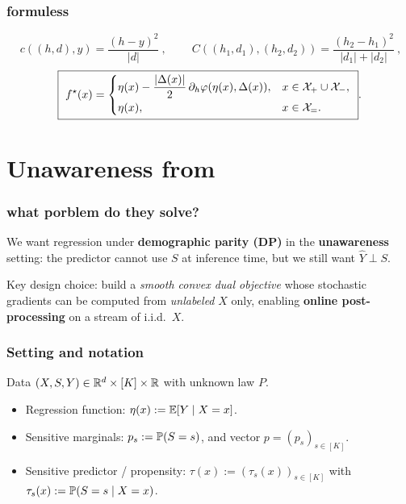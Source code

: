 \documentclass[11pt]{article}
\begin{document}
\section{formuless}
\begin{equation}
\boxed{~c((h,d),y)=\frac{(h-y)^2}{|d|}~},\qquad
\boxed{~C((h_1,d_1),(h_2,d_2))=\frac{(h_2-h_1)^2}{|d_1|+|d_2|}~},
\end{equation}
\begin{equation}
\boxed{~f^\star(x)=
\begin{cases}
\eta(x)-\dfrac{|\Delta(x)|}{2}\,\partial_h\varphi(\eta(x),\Delta(x)), & x\in\mathcal{X}_+\cup\mathcal{X}_-,\\[4pt]
\eta(x), & x\in\mathcal{X}_=.
\end{cases}~}.
\end{equation}

\newpage


\clearpage
\part{Unawareness from \textcite{chzhen2024regressiondemographicparityconstraints}}
\label{part:chzhen}



\section{what porblem do they solve?}
We want regression under \textbf{demographic parity (DP)} in the \textbf{unawareness} setting:
the predictor cannot use $S$ at inference time, but we still want $\widehat Y \perp S$.

Key design choice: build a \emph{smooth convex dual objective} whose stochastic gradients can be
computed from \emph{unlabeled} $X$ only, enabling \textbf{online post-processing} on a stream of i.i.d.\ $X$.

\section{Setting and notation}
Data $(X,S,Y)\in \mathbb{R}^d \times [K]\times \mathbb{R}$ with unknown law $P$.
\begin{itemize}
  \item Regression function: $\eta(x) := \mathbb{E}[Y\mid X=x]$.
  \item Sensitive marginals: $p_s := \mathbb{P}(S=s)$, and vector $p=(p_s)_{s\in[K]}$.
  \item Sensitive predictor / propensity: $\tau(x) := (\tau_s(x))_{s\in[K]}$ with $\tau_s(x):=\mathbb{P}(S=s\mid X=x)$.
\end{itemize}
\end{document}
